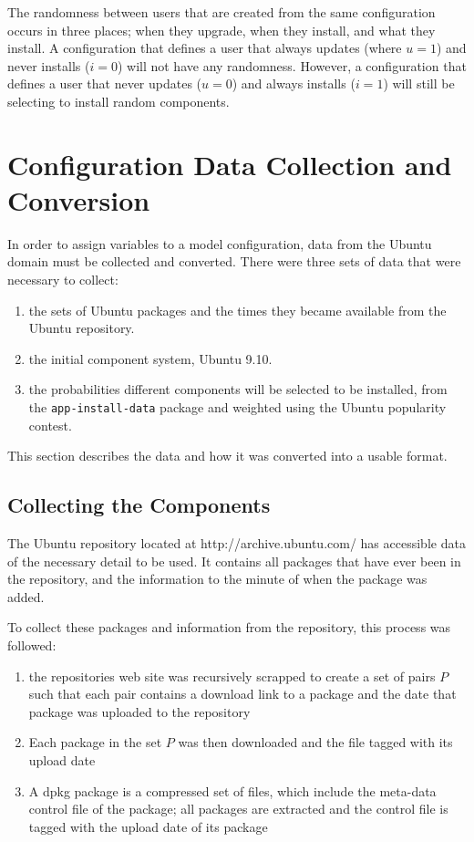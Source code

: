 The randomness between users that are created from the same configuration occurs in three places;
when they upgrade, when they install, and what they install.
A configuration that defines a user that always updates (where $u = 1$) and never installs ($i = 0$) will not have any randomness.
However, a configuration that defines a user that never updates ($u = 0$) and always installs ($i = 1$) will still be selecting to install random components.

\section{Configuration Data Collection and Conversion}
\label{sim.collection}
In order to assign variables to a \usermodel model configuration, data from the Ubuntu domain must be collected and converted.
There were three sets of data that were necessary to collect:
\begin{enumerate}
  \item the sets of Ubuntu packages and the times they became available from the Ubuntu repository.
  \item the initial component system, Ubuntu 9.10.
  \item the probabilities different components will be selected to be installed, from the \texttt{app-install-data} package and weighted using the Ubuntu popularity contest.
\end{enumerate}

This section describes the data and how it was converted into a usable format.

\subsection{Collecting the Components}
The Ubuntu repository located at http://archive.ubuntu.com/ has accessible data of the necessary detail to be used.
It contains all packages that have ever been in the repository, and the information to the minute of when the package was added.

To collect these packages and information from the repository, this process was followed:
\begin{enumerate}
  \item the repositories web site was recursively scrapped to create a set of pairs $P$ 
  such that each pair contains a download link to a package and the date that package was uploaded to the repository
  \item Each package in the set $P$ was then downloaded and the file tagged with its upload date
  \item A dpkg package is a compressed set of files, 
  which include the meta-data control file of the package; all packages are extracted and the control file is tagged with the upload date of its package 
\end{enumerate}

